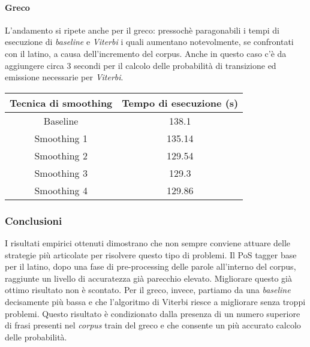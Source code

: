 \documentclass[11pt]{article}
\makeatletter
\newcommand{\boxspacing}{\kern\kvtcb@left@rule\kern\kvtcb@boxsep}
\newcommand{\prompt}[4]{
        {\ttfamily\llap{{\color{#2}[#3]:\hspace{3pt}#4}}\vspace{-\baselineskip}}
    }
\makeatother
\begin{document}
\hypertarget{greco-1}{%
\paragraph{Greco}\label{greco-1}}

L'andamento si ripete anche per il greco: pressochè paragonabili i tempi
di esecuzione di \emph{baseline} e \emph{Viterbi} i quali aumentano
notevolmente, se confrontati con il latino, a causa dell'incremento del
corpus. Anche in questo caso c'è da aggiungere circa 3 secondi per il
calcolo delle probabilità di transizione ed emissione necessarie per
\emph{Viterbi}.

\begin{longtable}[]{@{}cc@{}}
\toprule
Tecnica di smoothing & Tempo di esecuzione (s) \\
\midrule
\endhead
Baseline & 138.1 \\
Smoothing 1 & 135.14 \\
Smoothing 2 & 129.54 \\
Smoothing 3 & 129.3 \\
Smoothing 4 & 129.86 \\
\bottomrule
\end{longtable}

\hypertarget{conclusioni}{%
\subsubsection{Conclusioni}\label{conclusioni}}

I risultati empirici ottenuti dimostrano che non sempre conviene attuare
delle strategie più articolate per risolvere questo tipo di problemi. Il
PoS tagger base per il latino, dopo una fase di pre-processing delle
parole all'interno del corpus, raggiunte un livello di accuratezza già
parecchio elevato. Migliorare questo già ottimo risultato non è
scontato. Per il greco, invece, partiamo da una \emph{baseline}
decisamente più bassa e che l'algoritmo di Viterbi riesce a migliorare
senza troppi problemi. Questo risultato è condizionato dalla presenza di
un numero superiore di frasi presenti nel \emph{corpus} train del greco
e che consente un più accurato calcolo delle probabilità.

    \begin{tcolorbox}[breakable, size=fbox, boxrule=1pt, pad at break*=1mm,colback=cellbackground, colframe=cellborder]
\prompt{In}{incolor}{ }{\boxspacing}
\begin{Verbatim}[commandchars=\\\{\}]

\end{Verbatim}
\end{tcolorbox}


    
    
    
\end{document}
